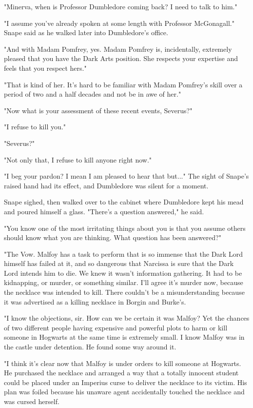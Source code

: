 \documentclass[a4paper,11pt]{article}
\begin{document}
"Minerva, when is Professor Dumbledore coming back? I need to talk to him."

"I assume you've already spoken at some length with Professor McGonagall." Snape said as he walked later into Dumbledore's office.

"And with Madam Pomfrey, yes. Madam Pomfrey is, incidentally, extremely pleased that you have the Dark Arts position. She respects your expertise and feels that you respect hers."

"That is kind of her. It's hard to be familiar with Madam Pomfrey's skill over a period of two and a half decades and not be in awe of her."

"Now what is your assessment of these recent events, Severus?"

"I refuse to kill you."

"Severus?"

"Not only that, I refuse to kill anyone right now."

"I beg your pardon? I mean I am pleased to hear that but..." The sight of Snape's raised hand had its effect, and Dumbledore was silent for a moment.

Snape sighed, then walked over to the cabinet where Dumbledore kept his mead and poured himself a glass. "There's a question answered," he said.

"You know one of the most irritating things about you is that you assume others should know what you are thinking. What question has been answered?"

"The Vow. Malfoy has a task to perform that is so immense that the Dark Lord himself has failed at it, and so dangerous that Narcissa is sure that the Dark Lord intends him to die. We knew it wasn't information gathering. It had to be kidnapping, or murder, or something similar. I'll agree it's murder now, because the necklace was intended to kill. There couldn't be a misunderstanding because it was advertised as a killing necklace in Borgin and Burke's.

"I know the objections, sir. How can we be certain it was Malfoy? Yet the chances of two different people having expensive and powerful plots to harm or kill someone in Hogwarts at the same time is extremely small. I know Malfoy was in the castle under detention. He found some way around it.

"I think it's clear now that Malfoy is under orders to kill someone at Hogwarts. He purchased the necklace and arranged a way that a totally innocent student could be placed under an Imperius curse to deliver the necklace to its victim. His plan was foiled because his unaware agent accidentally touched the necklace and was cursed herself.
\end{document}
